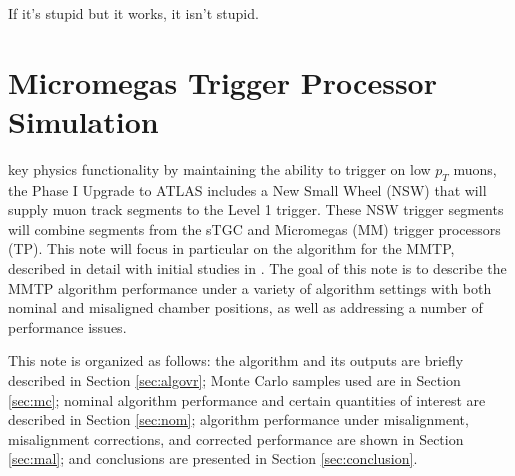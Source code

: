 \begin{savequote}[75mm]
If it's stupid but it works, it isn't stupid.
\end{savequote}

\chapter{Micromegas Trigger Processor Simulation}
\label{ch:mmt}

 key physics functionality by maintaining the ability to trigger on low $p_T$ muons, the Phase I Upgrade to ATLAS includes a New Small Wheel (NSW) that will supply muon track segments to the Level 1 trigger.  These NSW trigger segments will combine segments from the sTGC and Micromegas (MM) trigger processors (TP).  This note will focus in particular on the algorithm for the MMTP, described in detail with initial studies in \cite{blcnote}.  The goal of this note is to describe the MMTP algorithm performance under a variety of algorithm settings with both nominal and misaligned chamber positions, as well as addressing a number of performance issues.

This note is organized as follows: the algorithm and its outputs are briefly described in Section \ref{sec:algovr}; Monte Carlo samples used are in Section \ref{sec:mc}; nominal algorithm performance and certain quantities of interest are described in Section \ref{sec:nom}; algorithm performance under misalignment, misalignment corrections, and corrected performance are shown in Section \ref{sec:mal}; and conclusions are presented in Section \ref{sec:conclusion}.

